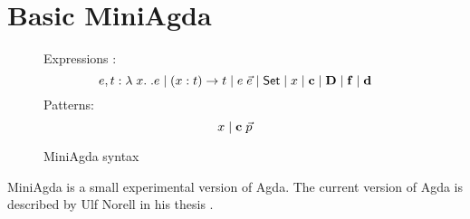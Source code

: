 \chapter{Basic MiniAgda}

\newcommand{\dd}{\mathbf{d}}
\newcommand{\DD}{\mathbf{D}}
\newcommand{\cc}{\mathbf{c}}
\newcommand{\ff}{\mathbf{f}}

\begin{figure}[p]
\caption{MiniAgda syntax}
Expressions : \[e,t :  \lam x . e \vsp \EPi{x}{t}{t} \vsp e \; \vec{e} \vsp  \Set \vsp x \vsp \cc \vsp \DD \vsp \ff \vsp \dd\]
Patterns: \[ x  \vsp \cc \; \vec{p} \]
\end{figure}

MiniAgda is a small experimental version of Agda.
The current version of Agda is described by Ulf Norell in his thesis \cite{norell:thesis}.

